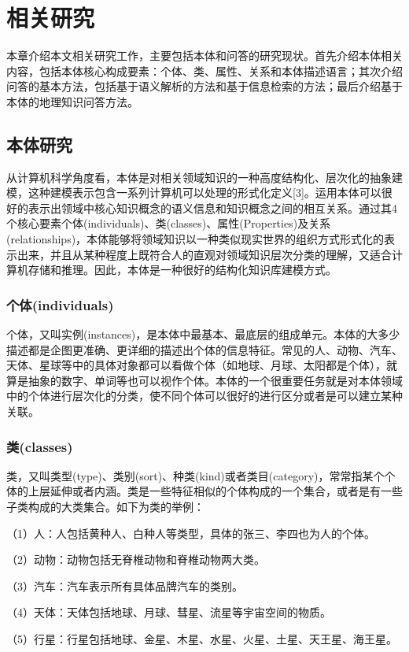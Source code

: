\chapter{相关研究}
本章介绍本文相关研究工作，主要包括本体和问答的研究现状。首先介绍本体相关内容，包括本体核心构成要素：个体、类、属性、关系和本体描述语言；其次介绍问答的基本方法，包括基于语义解析的方法和基于信息检索的方法；最后介绍基于本体的地理知识问答方法。

\section{本体研究}
从计算机科学角度看，本体是对相关领域知识的一种高度结构化、层次化的抽象建模，这种建模表示包含一系列计算机可以处理的形式化定义[3]。运用本体可以很好的表示出领域中核心知识概念的语义信息和知识概念之间的相互关系。通过其4个核心要素个体(individuals)、类(classes)、属性(Properties)及关系(relationships)，本体能够将领域知识以一种类似现实世界的组织方式形式化的表示出来，并且从某种程度上既符合人的直观对领域知识层次分类的理解，又适合计算机存储和推理。因此，本体是一种很好的结构化知识库建模方式。

\subsection{个体(individuals)}
个体，又叫实例(instances)，是本体中最基本、最底层的组成单元。本体的大多少描述都是企图更准确、更详细的描述出个体的信息特征。常见的人、动物、汽车、天体、星球等中的具体对象都可以看做个体（如地球、月球、太阳都是个体），就算是抽象的数字、单词等也可以视作个体。本体的一个很重要任务就是对本体领域中的个体进行层次化的分类，使不同个体可以很好的进行区分或者是可以建立某种关联。

\subsection{类(classes)}
类，又叫类型(type)、类别(sort)、种类(kind)或者类目(category)，常常指某个个体的上层延伸或者内涵。类是一些特征相似的个体构成的一个集合，或者是有一些子类构成的大类集合。如下为类的举例：

（1）人：人包括黄种人、白种人等类型，具体的张三、李四也为人的个体。

（2）动物：动物包括无脊椎动物和脊椎动物两大类。

（3）汽车：汽车表示所有具体品牌汽车的类别。

（4）天体：天体包括地球、月球、彗星、流星等宇宙空间的物质。

（5）行星：行星包括地球、金星、木星、水星、火星、土星、天王星、海王星。

